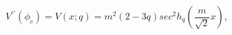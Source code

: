 \begin{equation}
V^{\prime \prime}(\phi_c)=V(x;q) =
m^2(2-3q)sec^2h_q\left(\frac{m}{\sqrt 2}x \right),
\end{equation}

